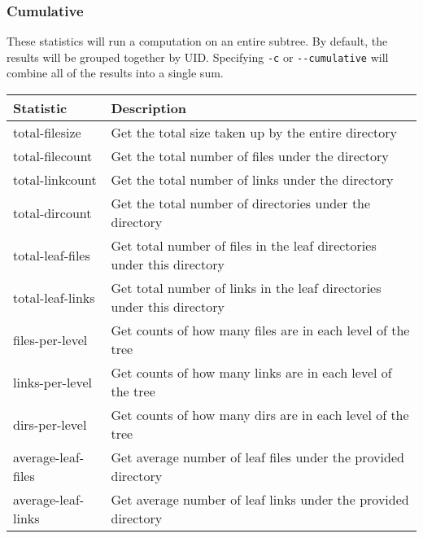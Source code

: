 \subsubsection{Cumulative}
These statistics will run a computation on an entire subtree. By
default, the results will be grouped together by UID. Specifying
\texttt{-c} or \texttt{-{}-cumulative} will combine all of the results
into a single sum.
\\
\begin{table}[h!]
  \begin{tabular} {| l | l |}
    \hline
    Statistic & Description \\
    \hline
    total-filesize & Get the total size taken up by the entire directory
    \\
    \hline
    total-filecount & Get the total number of files under the directory \\
    \hline
    total-linkcount & Get the total number of links under the directory \\
    \hline
    total-dircount & Get the total number of directories under the
    directory \\
    \hline
    total-leaf-files & Get total number of files in the leaf directories
    under this directory \\
    \hline
    total-leaf-links & Get total number of links in the leaf directories
    under this directory \\
    \hline
    files-per-level & Get counts of how many files are in each level of
    the tree \\
    \hline
    links-per-level & Get counts of how many links are in each level of
    the tree \\
    \hline
    dirs-per-level & Get counts of how many dirs are in each level of the
    tree \\
    \hline
    average-leaf-files & Get average number of leaf files under the
    provided directory \\
    \hline
    average-leaf-links & Get average number of leaf links under the
    provided directory \\
    \hline
  \end{tabular}
\end{table}

